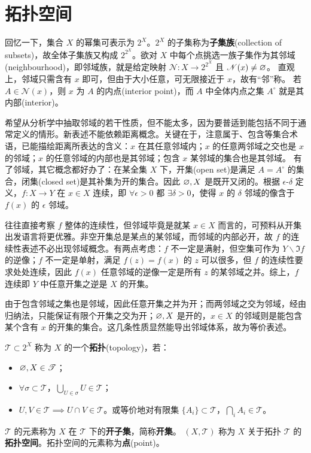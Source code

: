 \section{拓扑空间}

回忆一下，集合 $X$ 的幂集可表示为 $2^X$。$2^X$ 的子集称为\textbf{子集族}(collection of subsets)，故全体子集族又构成 $2^{2^X}$。欲对 $X$ 中每个点挑选⼀族⼦集作为其邻域(neighbourhood)，即邻域族，就是给定映射 $\mathscr N:X\to 2^{2^X}$ 且 $\mathscr N(x)\ne \varnothing$。
直观上，邻域只需含有 $x$ 即可，但由于大小任意，可无限接近于 $x$，故有“邻”称。
若 $A\in \mathscr N(x)$，则 $x$ 为 $A$ 的内点(interior point)，而 $A$ 中全体内点之集 $A^\circ$ 就是其内部(interior)。

希望从分析学中抽取邻域的若干性质，但不能太多，因为要普适到能包括不同于通常定义的情形。新表述不能依赖距离概念。关键在于，注意属于、包含等集合术语，已能描绘距离所表达的含义：$x$ 在其任意邻域内；$x$ 的任意两邻域之交也是 $x$ 的邻域；$x$ 的任意邻域的内部也是其邻域；包含 $x$ 某邻域的集合也是其邻域。
有了邻域，其它概念都好办了：在某全集 $X$ 下，开集(open set)是满足 $A=A^\circ$ 的集合，闭集(closed set)是其补集为开的集合。因此 $\varnothing,X$ 是既开又闭的。根据 $\epsilon$-$\delta$ 定义，$f:X\to Y$ 在 $x\in X$ 连续，即 $\forall\epsilon>0$ 都 $\exists\delta>0$，使得 $x$ 的 $\delta$ 邻域的像含于 $f(x)$ 的 $\epsilon$ 邻域。

往往直接考察 $f$ 整体的连续性，但邻域毕竟是就某 $x\in X$ 而言的，可预料从开集出发语言将更优雅。非空开集总是某点的某邻域，而邻域的内部必开，故 $f$ 的连续性表述不必出现邻域概念。有两点考虑：$f$ 不一定是满射，但空集可作为 $Y\backslash\Im f$ 的逆像；$f$ 不一定是单射，满足 $f(z)=f(x)$ 的 $z$ 可以很多，但 $f$ 的连续性要求处处连续，因此 $f(x)$ 任意邻域的逆像一定是所有 $z$ 的某邻域之并。综上，$f$ 连续即 $Y$ 中任意开集之逆是 $X$ 的开集。

由于包含邻域之集也是邻域，因此任意开集之并为开；而两邻域之交为邻域，经由归纳法，只能保证有限个开集之交为开；$\varnothing,X$ 是开的，$x\in X$ 的邻域则是能包含某个含有 $x$ 的开集的集合。这几条性质显然能导出邻域体系，故为等价表述。

\begin{definition}
$\mathscr{T}\subset 2^X$ 称为 $X$ 的一个\textbf{拓扑}(topology)，若：
\begin{itemize}
    \item $\varnothing,X \in \mathscr{T}$；
    \item $\forall \sigma\subset \mathscr{T}$，$\bigcup_{U\in\sigma} U\in \mathscr{T}$；
    \item $U,V\in\mathscr{T}\implies U\cap V\in\mathscr{T}$。或等价地对有限集 $\{A_{i}\} \subset \mathscr{T}$，$\bigcap_{i} A_{i} \in \mathscr{T}$。
\end{itemize}
$\mathscr{T}$ 的元素称为 $X$ 在 $\mathscr{T}$ 下的\textbf{开子集}，简称\textbf{开集}。
$(X,\mathscr T)$ 称为 $X$ 关于拓扑 $\mathscr T$ 的\textbf{拓扑空间}。拓扑空间的元素称为\textbf{点}(point)。
\end{definition}

